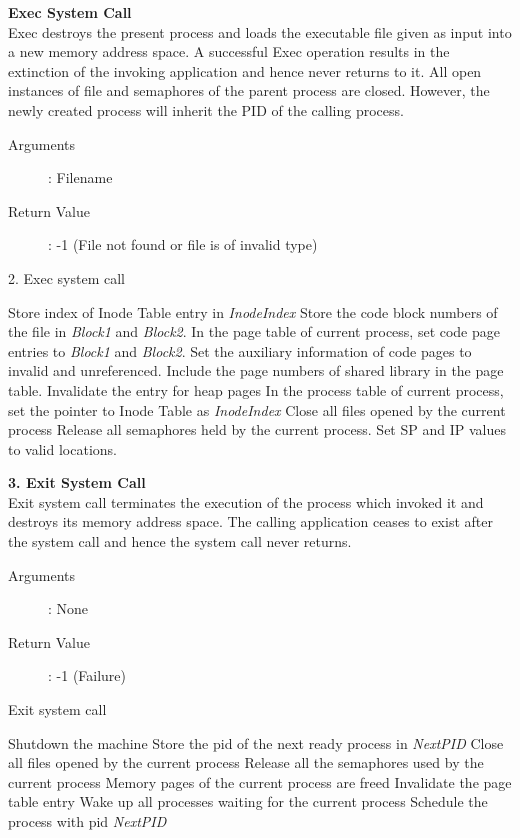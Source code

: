 \documentclass[11pt ,twosided]{article}
\begin{document}
\textbf{Exec System Call}
\\
Exec destroys the present process and loads the executable file given as input into a new memory address space. A successful Exec operation results in the extinction of the invoking application and hence never returns to it. All open instances of file and semaphores of the parent process are closed. However, the newly created process will inherit the PID of the calling process.
\begin{description}
\item[Arguments]: Filename
\item[Return Value]: -1 (File not found or file is of invalid type)
\end{description} 
\begin{algorithm}
\caption{2. Exec system call}
\begin{algorithmic}
\ELSE
    \ELSE
        \STATE Store index of Inode Table entry in \textit{InodeIndex}
        \STATE Store the code block numbers of the file in \textit{Block1} and \textit{Block2}.
    \ENDIF
\ENDIF
\STATE In the page table of current process, set code page entries to \textit{Block1} and \textit{Block2}.
\STATE Set the auxiliary information of code pages to invalid and unreferenced.
\STATE Include the page numbers of shared library in the page table.
\STATE Invalidate the entry for heap pages
\STATE In the process table of current process, set the pointer to Inode Table as \textit{InodeIndex}
\STATE Close all files opened by the current process
\STATE Release all semaphores held by the current process.
\STATE Set SP and IP values to valid locations.
\end{algorithmic}
\end{algorithm}
\fi
\textbf{3. Exit System Call}
\vspace{2mm}\\
 Exit system call terminates the execution of the process which invoked it and destroys its memory address space. The calling application ceases to exist after the system call and hence the system call never returns.
\begin{description}
\item[Arguments]: None
\item[Return Value]: -1 (Failure)
\end{description} 
\iffalse
\begin{algorithm}
\caption{Exit system call}
\begin{algorithmic}
    \STATE Shutdown the machine
\ELSE 
    \STATE Store the pid of the next ready process in \textit{NextPID}
\ENDIF
\STATE Close all files opened by the current process
\STATE Release all the semaphores used by the current process
\STATE Memory pages of the current process are freed
\STATE Invalidate the page table entry
\STATE Wake up all processes waiting for the current process
\STATE Schedule the process with pid \textit{NextPID}
\RETURN 
\end{algorithmic}
\end{algorithm}
\end{document}
